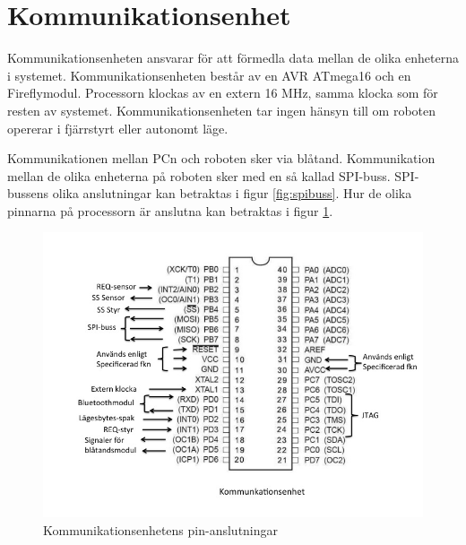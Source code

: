%

\section{Kommunikationsenhet}

Kommunikationsenheten ansvarar för att förmedla data mellan de olika 
enheterna i systemet. Kommunikationsenheten består av en AVR ATmega16 och en 
Fireflymodul. Processorn klockas av en extern 16 MHz, samma klocka som för 
resten av systemet. Kommunikationsenheten tar ingen hänsyn till om roboten 
opererar i fjärrstyrt eller autonomt läge.

Kommunikationen mellan PCn och roboten sker via blåtand. Kommunikation mellan 
de olika enheterna på roboten sker med en så kallad SPI-buss. SPI-bussens 
olika anslutningar kan betraktas i figur \ref{fig:spibuss}. Hur de olika 
pinnarna på processorn är anslutna kan betraktas i figur \ref{fig:PINkomm}.

\begin{figure}[H]
  \centering
 \includegraphics[angle=0,scale=0.5]{bilder/PIN_komm.jpg}
  \caption{Kommunikationsenhetens pin-anslutningar}
  \label{fig:PINkomm}
\end{figure}

